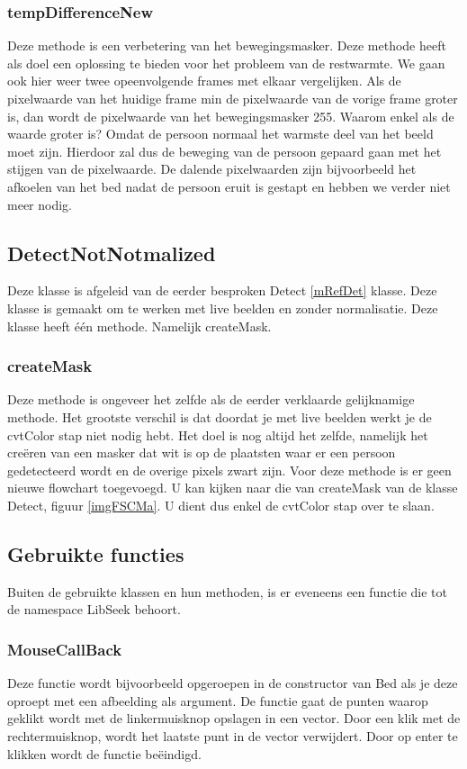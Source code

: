  \subsubsection{tempDifferenceNew}
Deze methode is een verbetering van het bewegingsmasker. Deze methode heeft als doel een oplossing te bieden voor het probleem van de restwarmte. We gaan ook hier weer twee opeenvolgende frames met elkaar vergelijken. Als de pixelwaarde van het huidige frame min de pixelwaarde van de vorige frame groter is, dan wordt de pixelwaarde van het bewegingsmasker 255. Waarom enkel als de waarde groter is? Omdat de persoon normaal het warmste deel van het beeld moet zijn. Hierdoor zal dus de beweging van de persoon gepaard gaan met het stijgen van de pixelwaarde. De dalende pixelwaarden zijn bijvoorbeeld het afkoelen van het bed nadat de persoon eruit is gestapt en hebben we verder niet meer nodig.
 
 \subsection{DetectNotNotmalized}
 \label{mRefDNN}
Deze klasse is afgeleid van de eerder besproken Detect \ref{mRefDet} klasse. Deze klasse is gemaakt om te werken met live beelden en zonder normalisatie. Deze klasse heeft \'e\'en methode. Namelijk createMask.
 
 \subsubsection{createMask}
 Deze methode is ongeveer het zelfde als de eerder verklaarde gelijknamige methode. Het grootste verschil is dat doordat je met live beelden werkt je de cvtColor stap niet nodig hebt. Het doel is nog altijd het zelfde, namelijk het cre\"eren van een masker dat wit is op de plaatsten waar er een persoon gedetecteerd wordt en de overige pixels zwart zijn. Voor deze methode is er geen nieuwe flowchart toegevoegd. U kan kijken naar die van createMask van de klasse Detect, figuur \ref{imgFSCMa}. U dient dus enkel de cvtColor stap over te slaan. 
 
\subsection{Gebruikte functies}
\label{MRefGFu}
Buiten de gebruikte klassen en hun methoden, is er eveneens een functie die tot de namespace LibSeek behoort.

\subsubsection{MouseCallBack}
Deze functie wordt bijvoorbeeld opgeroepen in de constructor van Bed als je deze oproept met een afbeelding als argument. De functie gaat de punten waarop geklikt wordt met de linkermuisknop opslagen in een vector. Door een klik met de rechtermuisknop, wordt het laatste punt in de vector verwijdert. Door op enter te klikken wordt de functie be\"eindigd. 

